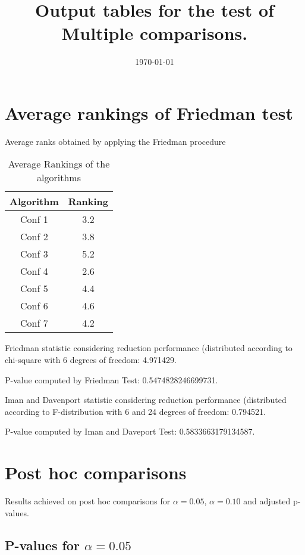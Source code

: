 \documentclass[a4paper,10pt]{article}
\title{Output tables for the test of Multiple comparisons.}
\author{}
\date{\today}
\begin{document}
\begin{landscape}
\pagestyle{empty}
\maketitle
\thispagestyle{empty}
\section{Average rankings of Friedman test}



Average ranks obtained by applying the Friedman procedure

\begin{table}[!htp]
\centering
\begin{tabular}{|c|c|}\hline
Algorithm&Ranking\\\hline
Conf 1 & 3.2\\
Conf 2 & 3.8\\
Conf 3 & 5.2\\
Conf 4 & 2.6\\
Conf 5 & 4.4\\
Conf 6 & 4.6\\
Conf 7 & 4.2\\
\hline
\end{tabular}
\caption{Average Rankings of the algorithms}
\end{table}

Friedman statistic considering reduction performance (distributed according to chi-square with 6 degrees of freedom: 4.971429.

P-value computed by Friedman Test: 0.5474828246699731.\newline

Iman and Davenport statistic considering reduction performance (distributed according to F-distribution with 6 and 24 degrees of freedom: 0.794521.

P-value computed by Iman and Daveport Test: 0.5833663179134587.\newline



\pagebreak

\section{Post hoc comparisons}

Results achieved on post hoc comparisons for $\alpha = 0.05$, $\alpha = 0.10$ and adjusted p-values.

\subsection{P-values for $\alpha=0.05$}


\end{landscape}
\end{document}
